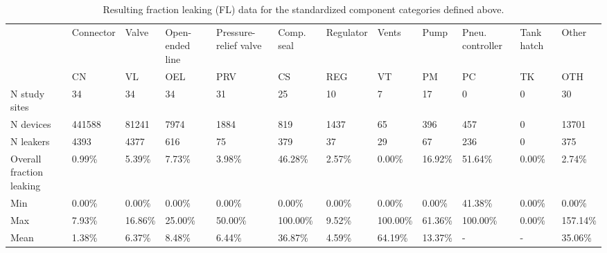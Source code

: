 \documentclass[11pt]{report}
\begin{document}
\begin{landscape}
\begin{table}
\begin{scriptsize}
\caption{Resulting fraction leaking (FL) data for the standardized component categories defined above.}
\label{tab:fraction_leaking_results}
\begin{tabular*}{1\columnwidth}{p{}p{}p{}p{}p{}p{}p{}p{}p{}p{}p{}p{}}
\toprule
			& Connector               & Valve  & Open-ended line & Pressure-relief valve & Comp. seal & Regulator & Vents  & Pump     & Pneu. controller & Tank hatch & Other           \\
                         & CN     & VL              & OEL                   & PRV             & CS        & REG    & VT       & PM                            & PC              & TK                  & OTH      \\
                         \midrule
N study sites            & 34     & 34              & 34                    & 31              & 25        & 10     & 7        & 17                            & 0               & 0                   & 30       \\
N devices                & 441588 & 81241           & 7974                  & 1884            & 819       & 1437   & 65       & 396                           & 457             & 0                   & 13701    \\
N leakers                & 4393   & 4377            & 616                   & 75              & 379       & 37     & 29       & 67                            & 236             & 0                   & 375      \\
Overall fraction leaking & 0.99\% & 5.39\%          & 7.73\%                & 3.98\%          & 46.28\%   & 2.57\% & 0.00\%   & 16.92\%                       & 51.64\%         & 0.00\%              & 2.74\%   \\
\midrule
Min                      & 0.00\% & 0.00\%          & 0.00\%                & 0.00\%          & 0.00\%    & 0.00\% & 0.00\%   & 0.00\%                        & 41.38\%         & 0.00\%              & 0.00\%   \\
Max                      & 7.93\% & 16.86\%         & 25.00\%               & 50.00\%         & 100.00\%  & 9.52\% & 100.00\% & 61.36\%                       & 100.00\%        & 0.00\%              & 157.14\% \\
Mean                     & 1.38\% & 6.37\%          & 8.48\%                & 6.44\%          & 36.87\%   & 4.59\% & 64.19\%  & 13.37\%                       & -               & -                   & 35.06\%  \\

\end{tabular*}
\end{scriptsize}
\end{table}
\end{landscape}
\end{document}
